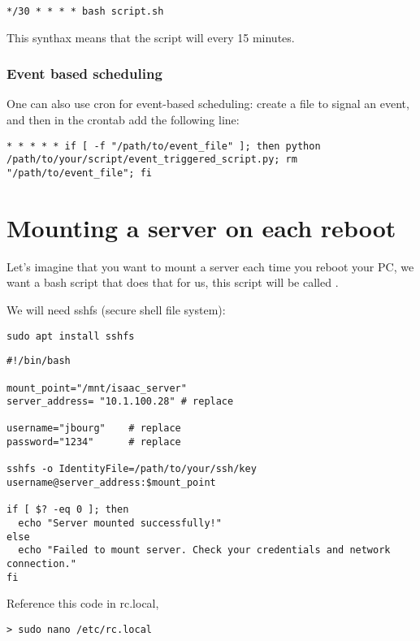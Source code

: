 \documentclass[24pt]{article}
\begin{document}
\begin{lstlisting}
*/30 * * * * bash script.sh
\end{lstlisting}
This synthax means that the script will every 15 minutes.

\subsubsection{Event based scheduling}

One can also use cron for event-based scheduling: create a file to signal an event, and then in the crontab add the following line: 

\begin{lstlisting}
* * * * * if [ -f "/path/to/event_file" ]; then python /path/to/your/script/event_triggered_script.py; rm "/path/to/event_file"; fi
\end{lstlisting}


\section{Mounting a server on each reboot}
  
Let's imagine that you want to mount a server each time you reboot your PC, we want a bash script that does that for us, this script will be called .  
  
We will need sshfs (secure shell file system):

\begin{lstlisting}
sudo apt install sshfs  
\end{lstlisting}

  
  
\begin{lstlisting}
#!/bin/bash

mount_point="/mnt/isaac_server"
server_address= "10.1.100.28" # replace

username="jbourg"    # replace
password="1234"      # replace

sshfs -o IdentityFile=/path/to/your/ssh/key username@server_address:$mount_point

if [ $? -eq 0 ]; then
  echo "Server mounted successfully!"
else
  echo "Failed to mount server. Check your credentials and network connection."
fi
\end{lstlisting}
 
Reference this code in rc.local,

\begin{lstlisting}
> sudo nano /etc/rc.local
\end{lstlisting}
\end{document}
